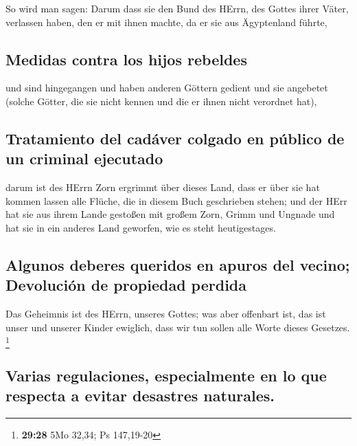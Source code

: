  So wird man sagen: Darum dass sie den Bund des HErrn,
des Gottes ihrer Väter, verlassen haben, den er mit ihnen machte, da er
sie aus Ägyptenland führte,

\hypertarget{medidas-contra-los-hijos-rebeldes}{%
\subsection{Medidas contra los hijos
rebeldes}\label{medidas-contra-los-hijos-rebeldes}}

 und sind hingegangen und haben anderen Göttern gedient
und sie angebetet (solche Götter, die sie nicht kennen und die er ihnen
nicht verordnet hat),

\hypertarget{tratamiento-del-caduxe1ver-colgado-en-puxfablico-de-un-criminal-ejecutado}{%
\subsection{Tratamiento del cadáver colgado en público de un criminal
ejecutado}\label{tratamiento-del-caduxe1ver-colgado-en-puxfablico-de-un-criminal-ejecutado}}

 darum ist des HErrn Zorn ergrimmt über dieses Land, dass
er über sie hat kommen lassen alle Flüche, die in diesem Buch
geschrieben stehen;  und der HErr hat sie aus ihrem Lande
gestoßen mit großem Zorn, Grimm und Ungnade und hat sie in ein anderes
Land geworfen, wie es steht heutigestages.

\hypertarget{algunos-deberes-queridos-en-apuros-del-vecino-devoluciuxf3n-de-propiedad-perdida}{%
\subsection{Algunos deberes queridos en apuros del vecino; Devolución de
propiedad
perdida}\label{algunos-deberes-queridos-en-apuros-del-vecino-devoluciuxf3n-de-propiedad-perdida}}

 Das Geheimnis ist des HErrn, unseres Gottes; was aber
offenbart ist, das ist unser und unserer Kinder ewiglich, dass wir tun
sollen alle Worte dieses Gesetzes. \footnote{\textbf{29:28} 5Mo 32,34;
  Ps 147,19-20}

\hypertarget{varias-regulaciones-especialmente-en-lo-que-respecta-a-evitar-desastres-naturales.}{%
\subsection{Varias regulaciones, especialmente en lo que respecta a
evitar desastres
naturales.}\label{varias-regulaciones-especialmente-en-lo-que-respecta-a-evitar-desastres-naturales.}}

